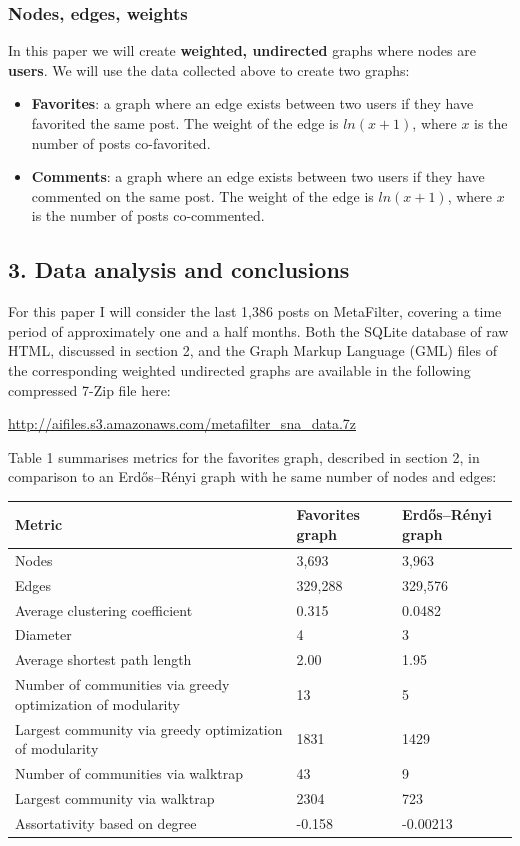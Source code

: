 \subsubsection{Nodes, edges, weights}

In this paper we will create \textbf{weighted, undirected} graphs where
nodes are \textbf{users}. We will use the data collected above to create
two graphs:

\begin{itemize}
\item
  \textbf{Favorites}: a graph where an edge exists between two users if
  they have favorited the same post. The weight of the edge is
  $ln(x+1)$, where $x$ is the number of posts co-favorited.
\item
  \textbf{Comments}: a graph where an edge exists between two users if
  they have commented on the same post. The weight of the edge is
  $ln(x+1)$, where $x$ is the number of posts co-commented.
\end{itemize}

\subsection{3. Data analysis and conclusions}

For this paper I will consider the last 1,386 posts on MetaFilter,
covering a time period of approximately one and a half months. Both the
SQLite database of raw HTML, discussed in section 2, and the Graph
Markup Language (GML) files of the corresponding weighted undirected
graphs are available in the following compressed 7-Zip file here:

\url{http://aifiles.s3.amazonaws.com/metafilter_sna_data.7z}

Table 1 summarises metrics for the favorites graph, described in section
2, in comparison to an Erdős--Rényi graph with he same number of nodes
and edges:

\begin{tabular}{|l|l|l|}\hline
Metric & Favorites graph & Erdős–Rényi graph \\ \hline
Nodes  & 3,693 & 3,963 \\
Edges  & 329,288 & 329,576 \\
Average clustering coefficient & 0.315 & 0.0482 \\
Diameter & 4 & 3 \\
Average shortest path length & 2.00 & 1.95 \\
Number of communities via greedy optimization of modularity & 13 & 5 \\
Largest community via greedy optimization of modularity & 1831 & 1429 \\
Number of communities via walktrap & 43 & 9 \\
Largest community via walktrap & 2304 & 723 \\
Assortativity based on degree & -0.158 & -0.00213 \\
\end{tabular}

